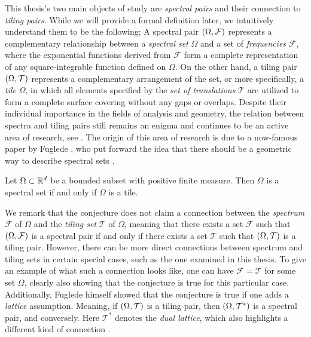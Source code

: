 \documentclass[../thesis.tex]{subfiles}
\begin{document}
This thesis's two main objects of study are \emph{spectral pairs} and their connection to \emph{tiling pairs}. While we will provide a formal definition later, we intuitively understand them to be the following; A spectral pair $(\Omega,\mathcal{F})$ represents a complementary relationship between a \emph{spectral set} $\Omega$ and a set of \emph{frequencies} $\mathcal{F}$, where the exponential functions derived from $\mathcal{F}$ form a complete representation of any square-integrable function defined on $\Omega$. On the other hand, a tiling pair $(\Omega,\mathcal{T})$ represents a complementary arrangement of the set, or more specifically, a \emph{tile} $\Omega$, in which all elements specified by the \emph{set of translations} $\mathcal{T}$ are utilized to form a complete surface covering without any gaps or overlaps. Despite their individual importance in the fields of analysis and geometry, the relation between spectra and tiling pairs still remains an enigma and continues to be an active area of research, see \cite{levFugledeConjectureConvex2022,kissFugledeConjectureHolds2022}. The origin of this area of research is due to a now-famous paper by Fuglede \cite{fugledeCommutingSelfadjointPartial1974}, who put forward the idea that there should be a geometric way to describe spectral sets \cite{lagariasOrthonormalBasesExponentials2000,liDualityPropertiesSpectra2010}. 

\begin{conjecture}[Spectral set conjecture or Fuglede's conjecture]  
    Let $\Omega\subset \mathbb{R}^d$ be a bounded subset with positive finite measure. Then $\Omega$ is a spectral set if and only if $\Omega$ is a tile. 
\end{conjecture}

We remark that the conjecture does not claim a connection between the \emph{spectrum} $\mathcal{F}$ of $\Omega$ and the \emph{tiling set} $\mathcal{T}$ of $\Omega$, meaning that there exists a set $\mathcal{F}$ such that $(\Omega,\mathcal{F})$ is a spectral pair if and only if there exists a set $\mathcal{T}$ such that $(\Omega,\mathcal{T})$ is a tiling pair. However, there can be more direct connections between spectrum and tiling sets in certain special cases, such as the one examined in this thesis. To give an example of what such a connection looks like, one can have $\mathcal{F}=\mathcal{T}$ for some set $\Omega$, clearly also showing that the conjecture is true for this particular case. Additionally, Fuglede himself showed that the conjecture is true if one adds a \emph{lattice} assumption. Meaning, if $(\Omega,\mathcal{T})$ is a tiling pair, then $(\Omega,\mathcal{T^*})$ is a spectral pair, and conversely. Here $\mathcal{T^*}$ denotes the \emph{dual lattice}, which also highlights a different kind of connection \cite{fugledeCommutingSelfadjointPartial1974}.
\end{document}
